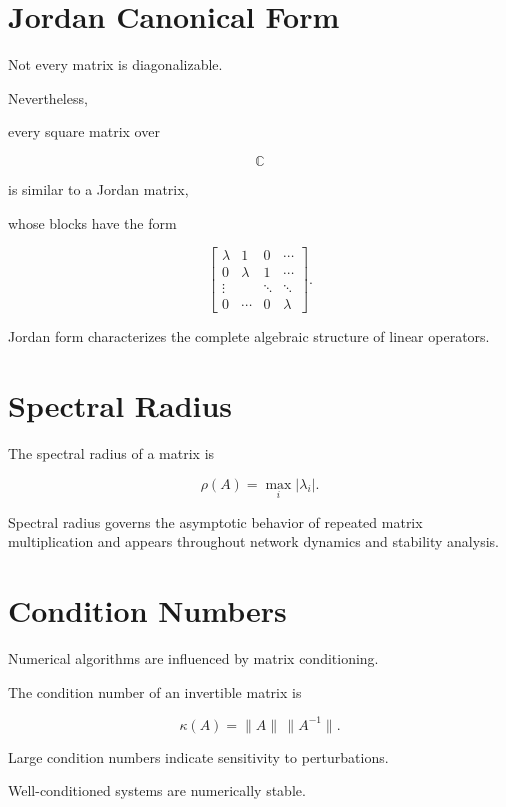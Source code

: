 \documentclass[11pt,fleqn]{book}
\numberwithin{equation}{chapter}
\theoremstyle{plain}
\theoremstyle{definition}
\theoremstyle{remark}
\begin{document}
\section{Jordan Canonical Form}

Not every matrix is diagonalizable.

Nevertheless,

every square matrix over

\[
\mathbb C
\]

is similar to a Jordan matrix,

whose blocks have the form

\[
\begin{bmatrix}
\lambda & 1 & 0 & \cdots\\
0 & \lambda & 1 & \cdots\\
\vdots & & \ddots & \ddots\\
0 & \cdots & 0 & \lambda
\end{bmatrix}.
\]

Jordan form characterizes the complete algebraic structure of linear
operators.


\section{Spectral Radius}

The spectral radius of a matrix is

\[
\boxed{
\rho(A)
=
\max_i
|\lambda_i|.
}
\]

Spectral radius governs the asymptotic behavior of repeated matrix
multiplication and appears throughout network dynamics and stability
analysis.


\section{Condition Numbers}

Numerical algorithms are influenced by matrix conditioning.

The condition number of an invertible matrix is

\[
\boxed{
\kappa(A)
=
\|A\|
\,
\|A^{-1}\|.
}
\]

Large condition numbers indicate sensitivity to perturbations.

Well-conditioned systems are numerically stable.
\end{document}
